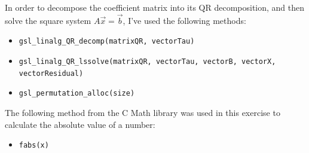 \documentclass{article}
\newcommand{\code}{\texttt}
\begin{document}
In order to decompose the coefficient matrix into its QR decomposition, and then solve the square system $A\vec{x}=\vec{b}$, I've used the following methods:
\begin{itemize}
  \item \code{gsl\_linalg\_QR\_decomp(matrixQR, vectorTau)}
  \item \code{gsl\_linalg\_QR\_lssolve(matrixQR, vectorTau, vectorB, vectorX, vectorResidual)}
  \item \code{gsl\_permutation\_alloc(size)}
\end{itemize}
The following method from the C Math library was used in this exercise to calculate the absolute value of a number:
\begin{itemize}
  \item \code{fabs(x)}
\end{itemize}
  
\end{document}
